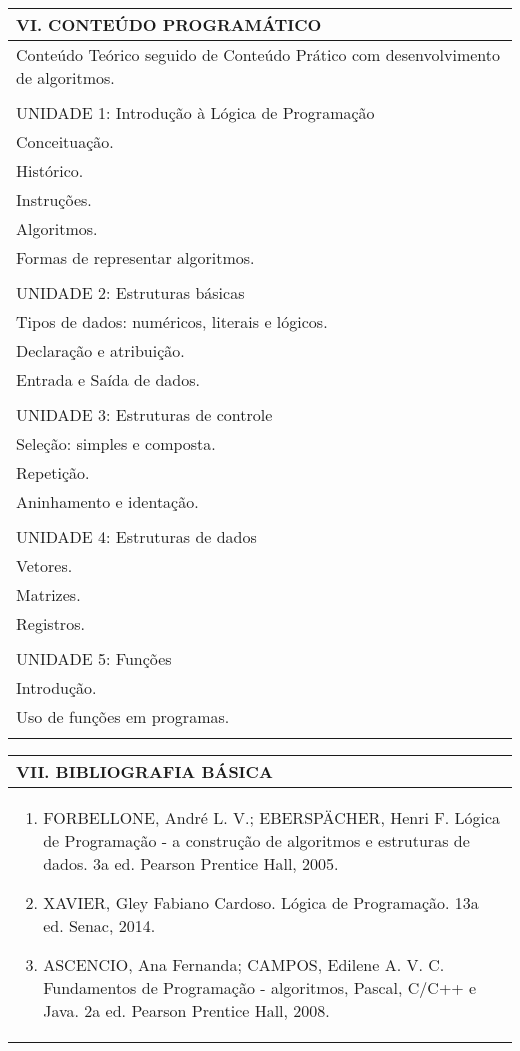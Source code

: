 \documentclass[12pt]{article}
\begin{document}
\begin{longtable}{|L{1.025\textwidth}|} \hline
%
{\bf VI. CONTEÚDO PROGRAMÁTICO } \\ \hline
Conteúdo Teórico seguido de Conteúdo Prático com desenvolvimento de algoritmos.\\
\\
UNIDADE 1: Introdução à Lógica de Programação\\
Conceituação.\\
Histórico.\\
Instruções.\\
Algoritmos.\\
Formas de representar algoritmos.\\
\\
UNIDADE 2: Estruturas básicas\\
Tipos de dados: numéricos, literais e lógicos.\\
Declaração e atribuição.\\
Entrada e Saída de dados.\\
\\
UNIDADE 3: Estruturas de controle\\
Seleção: simples e composta.\\
Repetição.\\
Aninhamento e identação.\\
\\
UNIDADE 4: Estruturas de dados\\
Vetores.\\
Matrizes.\\
Registros.\\
\\
UNIDADE 5: Funções\\
Introdução.\\
Uso de funções em programas.\\
\\ \hline
\end{longtable} 


\begin{longtable}{|L{1.025\textwidth}|} \hline
%
{\bf VII. BIBLIOGRAFIA BÁSICA} \\ \hline
\begin{enumerate}
%
\item FORBELLONE, André L. V.; EBERSPÄCHER, Henri F. Lógica de Programação - a construção de algoritmos e estruturas de dados. 3a ed. Pearson Prentice Hall, 2005. 
\item XAVIER, Gley Fabiano Cardoso. Lógica de Programação. 13a ed. Senac, 2014. 
\item ASCENCIO, Ana Fernanda; CAMPOS, Edilene A. V. C. Fundamentos de Programação - algoritmos, Pascal, C/C++ e Java. 2a ed. Pearson Prentice Hall, 2008. 

\end{enumerate}
 \\ \hline
\end{longtable}
\end{document}
